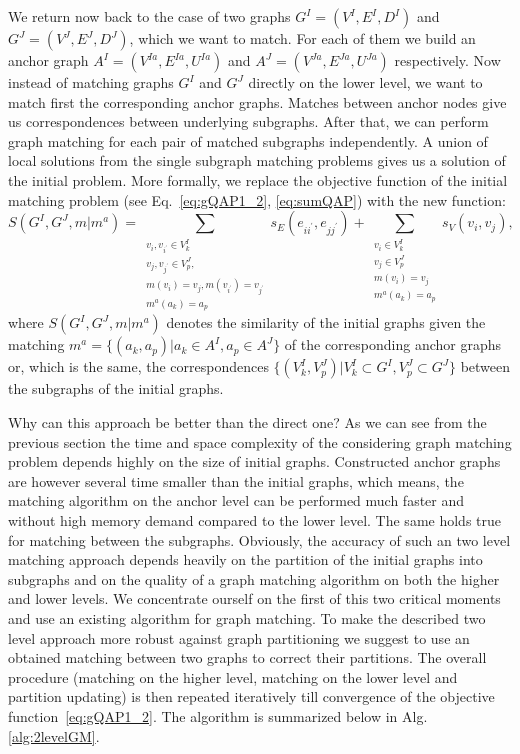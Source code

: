 We return now back to the case of two graphs $G^I=(V^I,E^I,D^I)$ and $G^J=(V^J,E^J,D^J)$, which we want to match. 
For each of them we build an anchor graph $A^I=(V^{Ia},E^{Ia},U^{Ia})$ and $A^J=(V^{Ja},E^{Ja},U^{Ja})$ respectively.
Now instead of matching graphs $G^I$ and $G^J$ directly on the lower level, we want to match first the corresponding anchor graphs. Matches between anchor nodes give us correspondences between underlying subgraphs. After that, we can perform graph matching for each pair of matched subgraphs independently. A union of local solutions from the single subgraph matching problems gives us a solution of the initial problem. More formally, we replace the objective function of the initial matching problem (see Eq.~\eqref{eq:gQAP1_2}, \eqref{eq:sumQAP}) with the new function:
\begin{equation}\label{eq:sumQAP_2}
	S(G^I,G^J,m|m^a)=\sum_{\substack{ v_{i},v_{i^\prime}\in V^I_k\\v_{j},v_{j^\prime}\in V^J_p,\\m(v_i)=v_j, m(v_{i^\prime})=v_{j^\prime}\\ m^a(a_k)=a_p}}s_E(e_{ii^\prime},e_{jj^\prime}) + \sum_{\substack{ v_{i}\in V^I_k\\v_{j}\in V^J_p\\m(v_i)=v_j\\ m^a(a_k)=a_p}}s_V(v_{i},v_{j}),
\end{equation}
where $S(G^I,G^J,m|m^a)$ denotes the similarity of the initial graphs given the matching $m^a=\{(a_k,a_p)|a_k\in A^I,a_p\in A^J\}$ of the corresponding anchor graphs or, which is the same, the correspondences $\{(V^ I_k,V^J_p)|V^I_k\subset G^I,V^J_p\subset G^J\}$ between the subgraphs of the initial graphs.

Why can this approach be better than the direct one? As we can see from the previous section the time and space complexity of the considering graph matching problem depends highly on the size of initial graphs. Constructed anchor graphs are however several time smaller than the initial graphs, which means, the matching algorithm on the anchor level can be performed much faster and without high memory demand compared to the lower level. The same holds true for matching between the subgraphs.
Obviously, the accuracy of such an two level matching approach depends heavily on the partition of the initial graphs into subgraphs and on the quality of a graph matching algorithm on both the higher and lower levels. We concentrate ourself on the first of this two critical moments and use an existing algorithm for graph matching. To make the described two level approach more robust against graph partitioning we suggest to use an obtained matching between two graphs to correct their partitions. The overall procedure (matching on the higher level, matching on the lower level and partition updating) is then repeated iteratively till convergence of the objective function~\eqref{eq:gQAP1_2}. The algorithm is summarized below in Alg.\ref{alg:2levelGM}.

